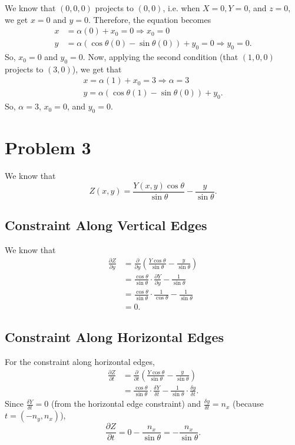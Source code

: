 \documentclass[a4paper]{article}
\begin{document}
We know that $(0, 0, 0)$ projects to $(0, 0)$, i.e. when $X = 0, Y = 0$, and $z = 0$, we get $x = 0$ and $y = 0$. Therefore, the equation becomes
\begin{align*}
    x &= \alpha (0) + x_0 = 0 \Longrightarrow x_0 = 0  \\
    y &= \alpha (\cos \theta (0)-\sin \theta (0)) + y_0 = 0 \Longrightarrow y_0 = 0.
\end{align*}
So, $x_0 = 0$ and $y_0 = 0$. Now, applying the second condition (that $(1, 0, 0)$ projects to $(3, 0)$), we get that
\begin{align*}
    x = \alpha(1) + x_0 = 3 \Longrightarrow \alpha = 3 \\
    y = \alpha(\cos \theta (1)-\sin \theta (0)) + y_0.
\end{align*}
So, $\alpha = 3$, $x_0 = 0$, and $y_0 = 0$.
\section{Problem 3}
We know that
$$Z(x, y) = \frac{Y(x, y) \cos \theta}{\sin \theta}- \frac{y}{\sin \theta}.$$
\subsection{Constraint Along Vertical Edges}
We know that 
\begin{align*}
\frac{\partial Z}{\partial y} &= \frac{\partial}{\partial y} \left( \frac{Y \cos \theta}{\sin \theta} - \frac{y}{\sin \theta} \right) 
\\ &= \frac{\cos \theta}{\sin \theta} \cdot \frac{\partial Y}{\partial y} - \frac{1}{\sin \theta}
\\ &= \frac{\cos \theta}{\sin \theta} \cdot \frac{1}{\cos \theta} - \frac{1}{\sin \theta}
\\ &= 0.
\end{align*}
\subsection{Constraint Along Horizontal Edges}
For the constraint along horizontal edges,
\begin{align*}
    \frac{\partial Z}{\partial t} &= \frac{\partial}{\partial t} \left( \frac{Y \cos \theta}{\sin \theta} - \frac{y}{\sin \theta} \right)
    \\ &= \frac{\cos \theta}{\sin \theta} \cdot \frac{\delta Y}{\delta t} - \frac{1}{\sin \theta} \cdot \frac{\delta y}{\delta t}.
\end{align*}
Since $\frac{\delta Y}{\delta t} = 0$ (from the horizontal edge constraint) and $\frac{\delta y}{\delta t} = n_x$ (because $t = (-n_y, n_x)$),
$$\frac{\partial Z}{\partial t} = 0 - \frac{n_x}{\sin \theta} = - \frac{n_x}{\sin \theta}.$$
\end{document}
